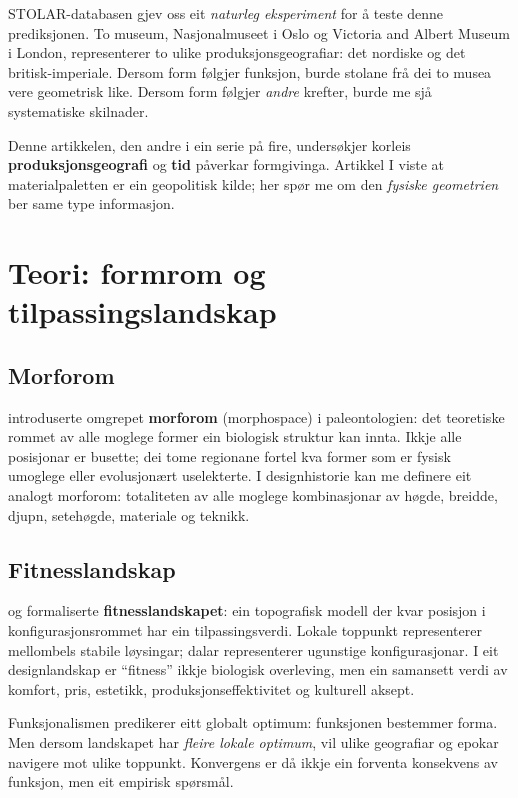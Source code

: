 \documentclass[10pt, a4paper, twocolumn]{article}
\begin{document}
STOLAR-databasen gjev oss eit \emph{naturleg eksperiment} for å teste denne prediksjonen. To museum, Nasjonalmuseet i Oslo og Victoria and Albert Museum i London, representerer to ulike produksjonsgeografiar: det nordiske og det britisk-imperiale. Dersom form følgjer funksjon, burde stolane frå dei to musea vere geometrisk like. Dersom form følgjer \emph{andre} krefter, burde me sjå systematiske skilnader.

Denne artikkelen, den andre i ein serie på fire, undersøkjer korleis \textbf{produksjonsgeografi} og \textbf{tid} påverkar formgivinga. Artikkel I \citep{finne2026} viste at materialpaletten er ein geopolitisk kilde; her spør me om den \emph{fysiske geometrien} ber same type informasjon.


\section{Teori: formrom og tilpassingslandskap}

\subsection{Morforom}

\citet{raup1966} introduserte omgrepet \textbf{morforom} (morphospace) i paleontologien: det teoretiske rommet av alle moglege former ein biologisk struktur kan innta. Ikkje alle posisjonar er busette; dei tome regionane fortel kva former som er fysisk umoglege eller evolusjonært uselekterte. I designhistorie kan me definere eit analogt morforom: totaliteten av alle moglege kombinasjonar av høgde, breidde, djupn, setehøgde, materiale og teknikk.

\subsection{Fitnesslandskap}

\citet{wright1932} og \citet{kauffman1993} formaliserte \textbf{fitnesslandskapet}: ein topografisk modell der kvar posisjon i konfigurasjonsrommet har ein tilpassingsverdi. Lokale toppunkt representerer mellombels stabile løysingar; dalar representerer ugunstige konfigurasjonar. I eit designlandskap er ``fitness'' ikkje biologisk overleving, men ein samansett verdi av komfort, pris, estetikk, produksjonseffektivitet og kulturell aksept.

Funksjonalismen predikerer eitt globalt optimum: funksjonen bestemmer forma. Men dersom landskapet har \emph{fleire lokale optimum}, vil ulike geografiar og epokar navigere mot ulike toppunkt. Konvergens er då ikkje ein forventa konsekvens av funksjon, men eit empirisk spørsmål.
\end{document}
